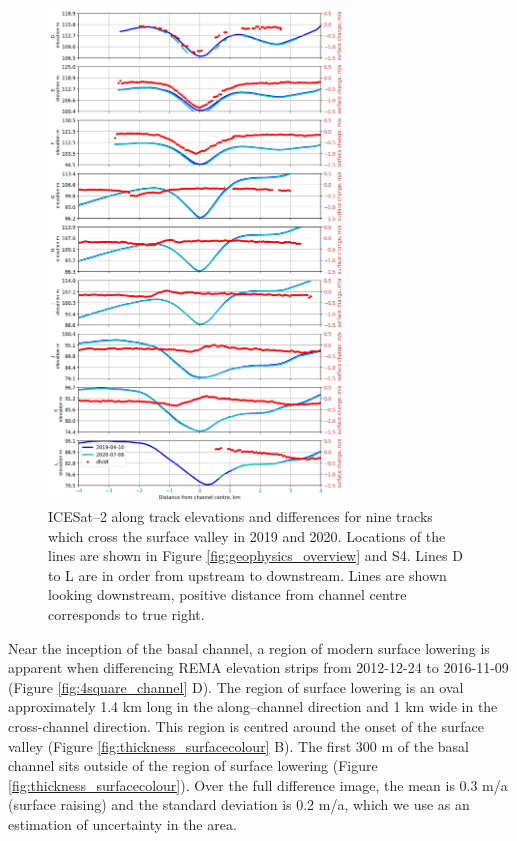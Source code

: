 \begin{figure}[!ht]
\centering
\includegraphics[width=0.7\textwidth]{chapters/2/icesat2_b.png}
\caption[ICESat--2 profiles]{ICESat--2 along track elevations and differences for nine tracks which cross the surface valley in 2019 and 2020. Locations of the lines are shown in Figure \ref{fig:geophysics_overview} and S4. Lines D to L are in order from upstream to downstream. Lines are shown looking downstream, positive distance from channel centre corresponds to true right.
 }
\label{fig:icesat2_b}
\end{figure}


Near the inception of the basal channel, a region of modern surface lowering is apparent when differencing REMA elevation strips from 2012-12-24 to 2016-11-09 (Figure \ref{fig:4square_channel} D). The region of surface lowering is an oval approximately 1.4 km long in the along--channel direction and 1 km wide in the cross-channel direction. This region is centred around the onset of the surface valley (Figure \ref{fig:thickness_surfacecolour} B).  The first 300 m of the basal channel sits outside of the region of surface lowering  (Figure \ref{fig:thickness_surfacecolour}). Over the full difference image, the mean is 0.3 m/a (surface raising) and the standard deviation is 0.2 m/a, which we use as an estimation of uncertainty in the area.

